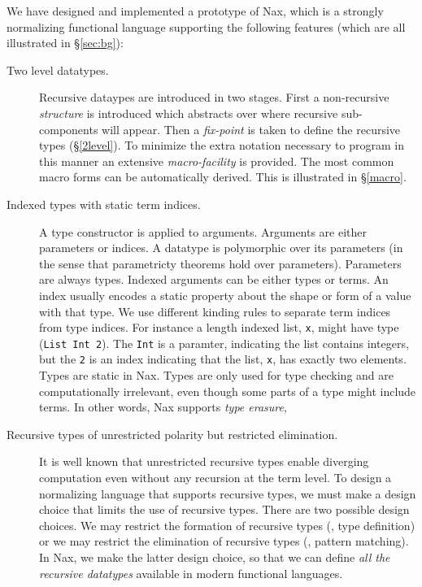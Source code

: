We have designed and implemented a prototype of Nax, which is
a strongly normalizing functional language supporting the following features
(which are all illustrated in \S\ref{sec:bg}):
\begin{description}

\item[Two level datatypes.]
Recursive dataypes are introduced in two stages. First a non-recursive
{\em structure} is introduced which abstracts over where recursive 
sub-components will appear. Then a {\em fix-point} is taken to define
the recursive types (\S \ref{2level}). To minimize the extra notation necessary to program
in this manner an extensive {\em macro-facility} is provided. The most common
macro forms can be automatically derived. This is illustrated in \S\ref{macro}.

\item[Indexed types with static term indices.]
A type constructor is applied to arguments. Arguments
are either parameters or indices. A datatype is polymorphic over
its parameters (in the sense that parametricty theorems hold over parameters).
Parameters are always types.
Indexed arguments can be either types or terms. An index usually
encodes a static property about the shape or form of a value with
that type. We use different kinding rules to separate
term indices from type indices. For instance a length indexed list, \verb+x+,
might have type (\verb+List Int 2+). The \verb+Int+ is a paramter, indicating
the list contains integers, but the \verb+2+ is an index indicating
that the list, \verb+x+, has exactly two elements.  
Types are static in Nax. Types are only used for type checking
and are computationally irrelevant, even though some parts of a type might include terms.
In other words, Nax supports \emph{type erasure},

\item[Recursive types of unrestricted polarity but restricted elimination.]
It is well known that unrestricted recursive types enable diverging computation
even without any recursion at the term level. To design a normalizing language
that supports recursive types, we must make a design choice that limits
the use of recursive types. There are two possible
design choices. We may restrict the formation of recursive types
(\ie, type definition) or we may restrict the elimination of recursive types
(\ie, pattern matching). In Nax, we make the latter design choice, so that we can
define \emph{all the recursive datatypes} available in modern functional languages.


\end{description}
